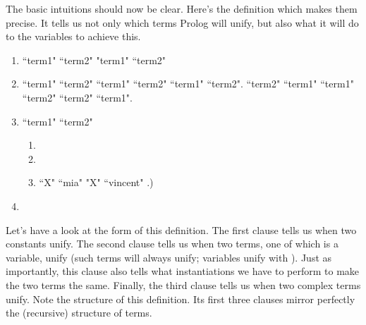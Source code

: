 The basic intuitions should now be clear.  Here's the definition which
makes them precise. It tells us not only which terms Prolog will
unify, but also what it will do to the variables to achieve this.
\begin{enumerate}
\item{} ``term1"  ``term2" 
"term1"  ``term2" 
\item{} ``term1"  ``term2"
 ``term1"  ``term2"
 ``term1"  ``term2".
 ``term2"  ``term1"
 ``term1"  ``term2"
 ``term2"  ``term1".

\item{} ``term1"  ``term2" 
\begin{enumerate}
\item{}
\item{}
\item{} ``X"  ``mia"
"X"  ``vincent" .)
\end{enumerate}

\item{}
\end{enumerate}

Let's have a look at the form of this definition. The first clause
tells us when two constants unify. The second clause tells us when two
terms, one of which is a variable, unify (such terms will always
unify; variables unify with ). Just as importantly,
this clause also tells what instantiations we have to perform to make
the two terms the same. Finally, the third clause tells us when two
complex terms unify.  Note the structure of this definition. Its first
three clauses mirror perfectly the (recursive) structure of terms.


